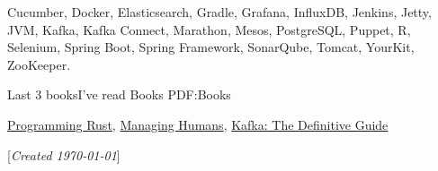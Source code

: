 \documentclass[letterpaper,MMMyyyy,nonstopmode]{simpleresumecv}
\newcommand{\CVNote}{Created {\today}}
\begin{document}
\begin{Body}
\Entry
Cucumber,
Docker,
Elasticsearch,
Gradle,
Grafana,
InfluxDB,
Jenkins,
Jetty,
JVM,
Kafka,
Kafka Connect,
Marathon,
Mesos,
PostgreSQL,
Puppet,
R,
Selenium,
Spring Boot,
Spring Framework,
SonarQube,
Tomcat,
YourKit,
ZooKeeper.
\BigGap


\Section
{Last 3 books\newline I've read}
{Books}
{PDF:Books}


\Entry
\href{https://www.amazon.com/Programming-Rust-Fast-Systems-Development/dp/1491927283}{Programming Rust},
\href{https://www.amazon.com/Managing-Humans-Humorous-Software-Engineering/dp/1484221575}{Managing Humans},
\href{https://www.amazon.com/Kafka-Definitive-Real-Time-Stream-Processing/dp/1491936169}{Kafka: The Definitive Guide}

\BigGap


\end{Body}


\BigGap
\UseNoteFont%
\null\hfill%
[\textit{\CVNote}]
\end{document}
